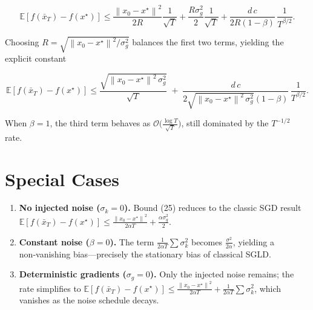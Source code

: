 \documentclass[11pt]{article}
\newcommand{\E}{\mathbb{E}}
\newcommand{\norm}[1]{\left\|#1\right\|}
\begin{document}
\[
\E\!\left[f(\bar x_{T})-f(x^{\star})\right]
\le \frac{\norm{x_{0}-x^{\star}}^{2}}{2R}\frac{1}{\sqrt{T}}
+\frac{R\sigma_{g}^{2}}{2}\frac{1}{\sqrt{T}}
+\frac{d\,c}{2R(1-\beta)}\,\frac{1}{T^{\beta/2}}.
\tag{26}
\]

Choosing $R = \sqrt{\norm{x_{0}-x^{\star}}^{2}/\sigma_{g}^{2}}$ balances the first two terms, yielding the explicit constant  

\[
\E\!\left[f(\bar x_{T})-f(x^{\star})\right]
\le
\frac{\sqrt{\norm{x_{0}-x^{\star}}^{2}\,\sigma_{g}^{2}}}{\sqrt{T}}
\;+\;
\frac{d\,c}{2\sqrt{\norm{x_{0}-x^{\star}}^{2}\,\sigma_{g}^{2}}(1-\beta)}\,
\frac{1}{T^{\beta/2}}.
\tag{27}
\]

When $\beta=1$, the third term behaves as $\mathcal O\big(\frac{\log T}{\sqrt{T}}\big)$, still dominated by the $T^{-1/2}$ rate.

\section*{Special Cases}
\begin{enumerate}[label=(\alph*)]
    \item \textbf{No injected noise ($\sigma_{k}=0$).}  Bound (25) reduces to the classic SGD result  
    $\E[f(\bar x_{T})-f(x^{\star})]\le \frac{\norm{x_{0}-x^{\star}}^{2}}{2\alpha T}+\frac{\alpha\sigma_{g}^{2}}{2}$.
    \item \textbf{Constant noise ($\beta=0$).}  The term $\frac{1}{2\alpha T}\sum\sigma_{k}^{2}$ becomes $\frac{\sigma^{2}}{2\alpha}$, yielding a non‑vanishing bias—precisely the stationary bias of classical SGLD.
    \item \textbf{Deterministic gradients ($\sigma_{g}=0$).}  Only the injected noise remains; the rate simplifies to  
    $\E[f(\bar x_{T})-f(x^{\star})]\le \frac{\norm{x_{0}-x^{\star}}^{2}}{2\alpha T}+\frac{1}{2\alpha T}\sum\sigma_{k}^{2}$, which vanishes as the noise schedule decays.
\end{enumerate}
\end{document}
